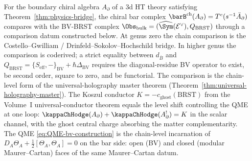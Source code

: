 \begin{remark}
\label{rem:bar-equals-BV-bridge}
For the boundary chiral algebra $A_\partial$ of a 3d HT theory satisfying
Theorem~\ref{thm:physics-bridge}, the chiral bar complex
$\barB^{\mathrm{ch}}(A_\partial) = T^c(s^{-1}\bar A_\partial)$
compares with the BV-BRST complex
$\Obs_{\mathrm{bulk}} = (\widehat{\Sym}(\mathcal E^\vee), Q_{\mathrm{BRST}})$
through a comparison datum constructed below. At
genus zero the chain comparison is the Costello--Gwilliam /
Drinfeld--Sokolov--Hochschild bridge. In higher genus the comparison is coderived; a strict equality between
$d_{\overline B}$ and
$Q_{\mathrm{BRST}}=\{S_{\mathrm{eff}},-\}_{\mathrm{BV}}
+\hbar\Delta_{\mathrm{BV}}$ requires the
diagonal-residue BV operator to exist, be second order, square to zero,
and be functorial. The comparison is the
chain-level form of the universal-holography master theorem
(Theorem~\ref{thm:universal-holography-master}).
The Koszul conductor $K = -c_{\mathrm{ghost}}(\mathrm{BRST})$ from the
Volume~I universal-conductor theorem equals the level shift controlling
the QME at one loop: $\kappaChHodge(A_\partial) + \kappaChHodge(A_\partial^!) = K$ in the
scalar channel, with the ghost central charge absorbing the matter
complementarity. The QME \eqref{eq:QME-bv-construction} is the
chain-level incarnation of $D_A\Theta_A + \tfrac12[\Theta_A, \Theta_A] = 0$
on the bar side: open (BV) and closed (modular Maurer--Cartan) faces of
the same Maurer--Cartan datum.
\end{remark}

